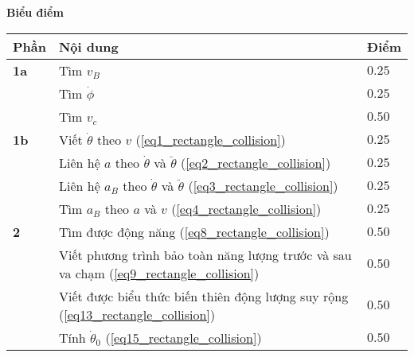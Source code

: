 \textbf{Biểu điểm}
\begin{center}
\begin{tabular}{|>{\centering\arraybackslash}m{1cm}|>{\raggedright\arraybackslash}m{14cm}| >{\centering\arraybackslash}m{1cm}|}
    \hline
    \textbf{Phần} & \textbf{Nội dung} & \textbf{Điểm} \\
    \hline
    \textbf{1a} & Tìm $v_B$ & $0.25$ \\
    \cline{2-3}
    & Tìm $\dot{\phi}$ & $0.25$ \\
    \cline{2-3}
    & Tìm $v_c$ & $0.50$ \\
    \hline
    \textbf{1b} & Viết $\dot{\theta}$ theo $v$ (\ref{eq1_rectangle_collision}) & $0.25$ \\
    \cline{2-3} 
    & Liên hệ $a$ theo $\dot{\theta}$ và $\ddot{\theta}$ (\ref{eq2_rectangle_collision}) & $0.25$ \\
    \cline{2-3}
    & Liên hệ $a_B$ theo $\dot{\theta}$ và $\ddot{\theta}$ (\ref{eq3_rectangle_collision}) & $0.25$ \\
    \cline{2-3}
    & Tìm $a_B$ theo $a$ và $v$ (\ref{eq4_rectangle_collision}) & $0.25$ \\
    \hline
    \textbf{2} & Tìm được động năng (\ref{eq8_rectangle_collision}) & $0.50$ \\
    \cline{2-3}
    & Viết phương trình bảo toàn năng lượng trước và sau va chạm (\ref{eq9_rectangle_collision}) & $0.50$ \\
    \cline{2-3}
    & Viết được biểu thức biến thiên động lượng suy rộng (\ref{eq13_rectangle_collision}) & $0.50$ \\
    \cline{2-3}
    & Tính $\dot{\theta}_0$ (\ref{eq15_rectangle_collision}) & $0.50$ \\
    \hline
\end{tabular}
\end{center}

